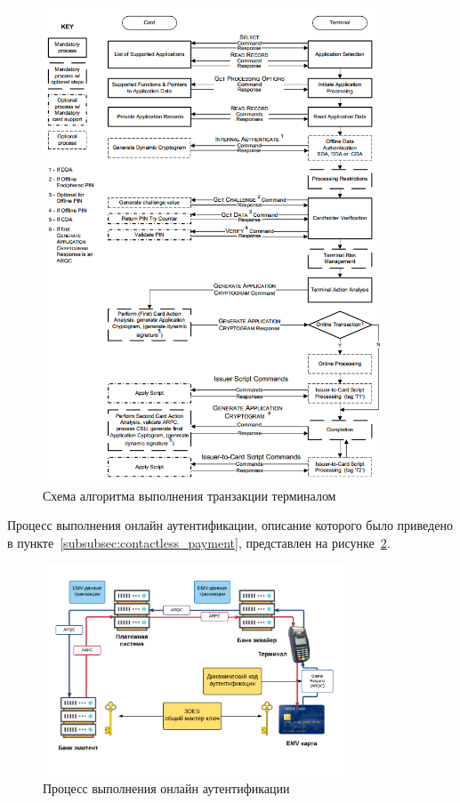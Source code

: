 \begin{figure}[H]
    \centering
    \includegraphics[width=0.9\textwidth]{images/research/transaction_flow_example}
    \caption{\centering Схема алгоритма выполнения транзакции терминалом}
    \label{fig:transaction_flow_example}
\end{figure}

Процесс выполнения онлайн аутентификации, описание которого было приведено в пункте~\ref{subsubsec:contactless_payment}, представлен на рисунке~\ref{fig:online_auth}.

\begin{figure}[H]
    \centering
    \includegraphics[width=0.8\textwidth]{images/research/online_auth}
    \caption{\centering Процесс выполнения онлайн аутентификации}
    \label{fig:online_auth}
\end{figure}


